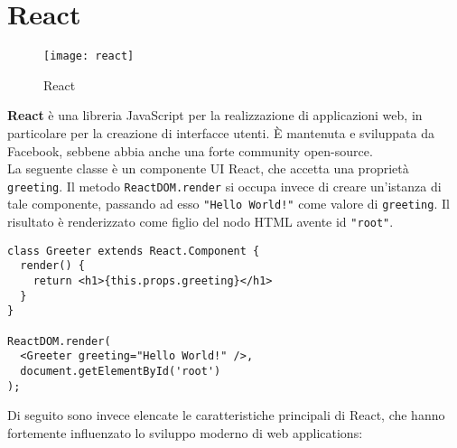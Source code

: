 \section{React}

\begin{figure}[H] 
  \centering 
  \texttt{[image: react]} 
  \caption{React}
\end{figure}

\textbf{React} è una libreria JavaScript per la realizzazione di applicazioni web, in particolare per la creazione di interfacce utenti. È mantenuta e sviluppata da Facebook, sebbene abbia anche una forte community open-source. \\

La seguente classe è un componente UI React, che accetta una proprietà \texttt{greeting}. Il metodo \texttt{ReactDOM.render} si occupa invece di creare un'istanza di tale componente, passando ad esso \texttt{"Hello World!"} come valore di \texttt{greeting}. Il risultato è renderizzato come figlio del nodo HTML avente id \texttt{"root"}. \\

\begin{lstlisting}[language={[Sharp]C}]
class Greeter extends React.Component { 
  render() { 
    return <h1>{this.props.greeting}</h1>
  } 
} 

ReactDOM.render(
  <Greeter greeting="Hello World!" />,
  document.getElementById('root')
);
\end{lstlisting}

Di seguito sono invece elencate le caratteristiche principali di React, che hanno fortemente influenzato lo sviluppo moderno di web applications:

